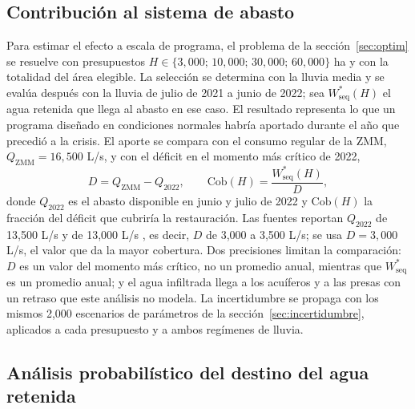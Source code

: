 \subsection{Contribución al sistema de abasto}\label{sec:abasto}

Para estimar el efecto a escala de programa, el problema de la sección~\ref{sec:optim} se resuelve con presupuestos $H\in\{3{,}000;\,10{,}000;\,30{,}000;\,60{,}000\}$ ha y con la totalidad del área elegible. La selección se determina con la lluvia media y se evalúa después con la lluvia de julio de 2021 a junio de 2022; sea $W^\ast_{\text{seq}}(H)$ el agua retenida que llega al abasto en ese caso. El resultado representa lo que un programa diseñado en condiciones normales habría aportado durante el año que precedió a la crisis. El aporte se compara con el consumo regular de la ZMM, $Q_{\text{ZMM}}=16{,}500$ L/s, y con el déficit en el momento más crítico de 2022,
\begin{equation}
D = Q_{\text{ZMM}} - Q_{2022},\qquad \text{Cob}(H)=\frac{W^\ast_{\text{seq}}(H)}{D},
\end{equation}
donde $Q_{2022}$ es el abasto disponible en junio y julio de 2022 y $\text{Cob}(H)$ la fracción del déficit que cubriría la restauración. Las fuentes reportan $Q_{2022}$ de 13,500 L/s  y de 13,000 L/s , es decir, $D$ de 3,000 a 3,500 L/s; se usa $D=3{,}000$ L/s, el valor que da la mayor cobertura. Dos precisiones limitan la comparación: $D$ es un valor del momento más crítico, no un promedio anual, mientras que $W^\ast_{\text{seq}}$ es un promedio anual; y el agua infiltrada llega a los acuíferos y a las presas con un retraso que este análisis no modela. La incertidumbre se propaga con los mismos 2,000 escenarios de parámetros de la sección~\ref{sec:incertidumbre}, aplicados a cada presupuesto y a ambos regímenes de lluvia.

\subsection{Análisis probabilístico del destino del agua retenida}\label{sec:destino}

